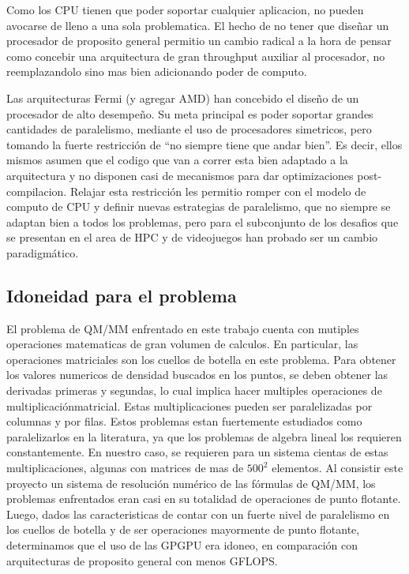 Como los CPU tienen que poder soportar cualquier aplicacion, no pueden avocarse de lleno a una sola
problematica. El hecho de no tener que dise\~nar un procesador de proposito general permitio un cambio radical
a la hora de pensar como concebir una arquitectura de gran throughput auxiliar al procesador, no reemplazandolo
sino mas bien adicionando poder de computo.~\cite{GlaskowskyFermi}

Las arquitecturas Fermi (y agregar AMD) han concebido el dise\~no de un procesador de alto desempe\~no.
Su meta principal es poder soportar grandes cantidades de paralelismo, mediante el uso de procesadores
simetricos, pero tomando la fuerte restricci\'on de ``no siempre tiene que andar bien''. Es decir, ellos
mismos asumen que el codigo que van a correr esta bien adaptado a la arquitectura y no disponen
casi de mecanismos para dar optimizaciones post-compilacion. Relajar esta restricci\'on
les permitio romper con el modelo de computo de CPU y definir nuevas estrategias de paralelismo,
que no siempre se adaptan bien a todos los problemas, pero para el subconjunto de los desafios que se
presentan en el area de HPC y de videojuegos han probado ser un cambio paradigm\'atico.

\subsection{Idoneidad para el problema}
El problema de QM/MM enfrentado en este trabajo cuenta con mutiples operaciones matematicas de gran
volumen de calculos. En particular, las operaciones matriciales son los cuellos de botella en este
problema.
Para obtener los valores numericos de densidad buscados en los puntos, se deben obtener las derivadas primeras
y segundas, lo cual implica hacer multiples operaciones de multiplicaci\'onmatricial. Estas multiplicaciones
pueden ser paralelizadas por columnas y por filas. Estos problemas estan fuertemente estudiados como paralelizarlos
en la literatura, ya que los problemas de algebra lineal los requieren constantemente.
En nuestro caso, se requieren para un sistema cientas de estas multiplicaciones, algunas con matrices de mas de
$500^2$ elementos. Al consistir este proyecto un sistema de resoluci\'on num\'erico de las f\'ormulas de QM/MM,
los problemas enfrentados eran casi en su totalidad de operaciones de punto flotante. Luego, dados las
caracteristicas de contar con un fuerte nivel de paralelismo en los cuellos de botella y de ser operaciones
mayormente de punto flotante, determinamos que el uso de las GPGPU era idoneo, en comparaci\'on con arquitecturas
de proposito general con menos GFLOPS.

